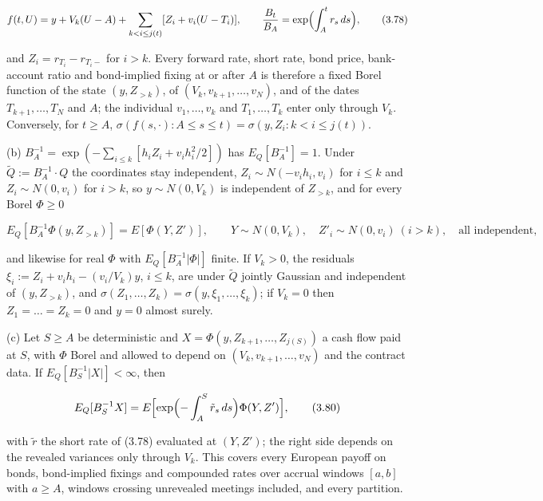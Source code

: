 \documentclass[11pt]{article}
\begin{document}
\begin{equation*}
f(t, U) = y + V_k (U - A) + \sum_{k < i \le j(t)} [Z_i + v_i (U - T_i)], \qquad \frac{B_t}{B_A} = \exp\Bigl( \int_A^t r_s\,ds \Bigr), \tag{3.78}\label{eq:3.78}
\end{equation*}

and \(Z_i = r_{T_i} - r_{T_i-}\) for \(i > k\). Every forward rate, short rate, bond price, bank-account ratio and bond-implied fixing at or after \(A\) is therefore a fixed Borel function of the state \((y, Z_{>k})\), of \((V_k, v_{k+1}, \dots, v_N)\), and of the dates \(T_{k+1}, \dots, T_N\) and \(A\); the individual \(v_1, \dots, v_k\) and \(T_1, \dots, T_k\) enter only through \(V_k\). Conversely, for \(t \ge A\), \(\sigma(f(s, \cdot) : A \le s \le t) = \sigma(y, Z_i : k < i \le j(t))\).

(b) \(B_A^{-1} = \exp(-\sum_{i \le k} [h_i Z_i + v_i h_i^2 / 2])\) has \(E_Q[B_A^{-1}] = 1\). Under \(\tilde Q := B_A^{-1} \cdot Q\) the coordinates stay independent, \(Z_i \sim N(-v_i h_i, v_i)\) for \(i \le k\) and \(Z_i \sim N(0, v_i)\) for \(i > k\), so \(y \sim N(0, V_k)\) is independent of \(Z_{>k}\), and for every Borel \(\Phi \ge 0\)

\begin{equation*}
E_Q[B_A^{-1} \Phi(y, Z_{>k})] = E[\Phi(Y, Z')], \qquad Y \sim N(0, V_k), \quad Z'_i \sim N(0, v_i) \ (i > k), \quad \text{all independent}, \tag{3.79}\label{eq:3.79}
\end{equation*}

and likewise for real \(\Phi\) with \(E_Q[B_A^{-1} |\Phi|]\) finite. If \(V_k > 0\), the residuals \(\xi_i := Z_i + v_i h_i - (v_i / V_k) y\), \(i \le k\), are under \(\tilde Q\) jointly Gaussian and independent of \((y, Z_{>k})\), and \(\sigma(Z_1, \dots, Z_k) = \sigma(y, \xi_1, \dots, \xi_k)\); if \(V_k = 0\) then \(Z_1 = \dots = Z_k = 0\) and \(y = 0\) almost surely.

(c) Let \(S \ge A\) be deterministic and \(X = \Phi(y, Z_{k+1}, \dots, Z_{j(S)})\) a cash flow paid at \(S\), with \(\Phi\) Borel and allowed to depend on \((V_k, v_{k+1}, \dots, v_N)\) and the contract data. If \(E_Q[B_S^{-1} |X|] < \infty\), then

\begin{equation*}
E_Q[B_S^{-1} X] = E\Bigl[ \exp\Bigl( -\int_A^S \tilde r_s\,ds \Bigr) \Phi(Y, Z') \Bigr], \tag{3.80}\label{eq:3.80}
\end{equation*}

with \(\tilde r\) the short rate of (3.78) evaluated at \((Y, Z')\); the right side depends on the revealed variances only through \(V_k\). This covers every European payoff on bonds, bond-implied fixings and compounded rates over accrual windows \([a, b]\) with \(a \ge A\), windows crossing unrevealed meetings included, and every partition.
\end{document}
